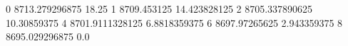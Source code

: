 0 8713.279296875 18.25
1 8709.453125 14.423828125
2 8705.337890625 10.30859375
4 8701.9111328125 6.8818359375
6 8697.97265625 2.943359375
8 8695.029296875 0.0
